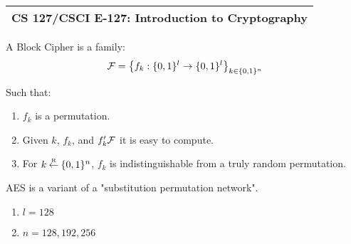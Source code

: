 \documentclass[11pt]{article}
\begin{document}
\begin{center}
\renewcommand{\arraystretch}{2}
\begin{tabular}{|c|}
\hline
{\large \bfseries CS 127/CSCI E-127: Introduction to Cryptography} \\
\hline
\end{tabular}
\renewcommand{\arraystretch}{1}
\end{center}
\vspace{1cm}

\begin{definition}
A Block Cipher is a family:
$$\mathcal{F} = \left\lbrace f_k:\{0,1\}^l\rightarrow\{0,1\}^l\right\rbrace_{k\in\{0,1\}^n}$$
\end{definition}
Such that:
\begin{enumerate}
\item $f_k$ is a permutation.
\item Given $k$, $f_k$, and $f'_k \mathcal{F}$ it is easy to compute.
\item For $k\mathbin{\stackrel{\mbox{\tiny R}}{\gets}}{\{0,1\}^n}$, $f_k$ is indistinguishable from a truly random permutation.
\end{enumerate}

\begin{definition}
AES is a variant of a "substitution permutation network".
\end{definition}
\begin{enumerate}
\item $l = 128$
\item $n = 128, 192, 256$
\end{enumerate}
\end{document}
